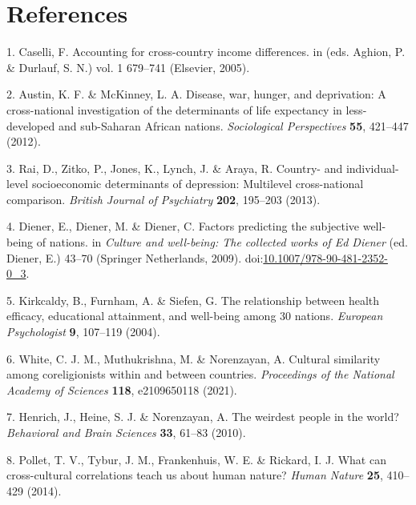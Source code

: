 \documentclass[english,man,floatsintext]{apa6}
\begin{document}
\newpage

\hypertarget{references}{%
\section{References}\label{references}}

\begingroup
\setlength{\parindent}{-0.5in}
\setlength{\leftskip}{0.5in}

\hypertarget{refs}{}
\leavevmode\hypertarget{ref-Caselli2005}{}%
1. Caselli, F. Accounting for cross-country income differences. in (eds. Aghion, P. \& Durlauf, S. N.) vol. 1 679--741 (Elsevier, 2005).

\leavevmode\hypertarget{ref-Austin2012}{}%
2. Austin, K. F. \& McKinney, L. A. Disease, war, hunger, and deprivation: A cross-national investigation of the determinants of life expectancy in less-developed and sub-Saharan African nations. \emph{Sociological Perspectives} \textbf{55}, 421--447 (2012).

\leavevmode\hypertarget{ref-Rai2013}{}%
3. Rai, D., Zitko, P., Jones, K., Lynch, J. \& Araya, R. Country- and individual-level socioeconomic determinants of depression: Multilevel cross-national comparison. \emph{British Journal of Psychiatry} \textbf{202}, 195--203 (2013).

\leavevmode\hypertarget{ref-Diener2009}{}%
4. Diener, E., Diener, M. \& Diener, C. Factors predicting the subjective well-being of nations. in \emph{Culture and well-being: The collected works of Ed Diener} (ed. Diener, E.) 43--70 (Springer Netherlands, 2009). doi:\href{https://doi.org/10.1007/978-90-481-2352-0_3}{10.1007/978-90-481-2352-0\_3}.

\leavevmode\hypertarget{ref-Kirkcaldy2004}{}%
5. Kirkcaldy, B., Furnham, A. \& Siefen, G. The relationship between health efficacy, educational attainment, and well-being among 30 nations. \emph{European Psychologist} \textbf{9}, 107--119 (2004).

\leavevmode\hypertarget{ref-White2021}{}%
6. White, C. J. M., Muthukrishna, M. \& Norenzayan, A. Cultural similarity among coreligionists within and between countries. \emph{Proceedings of the National Academy of Sciences} \textbf{118}, e2109650118 (2021).

\leavevmode\hypertarget{ref-Henrich2010}{}%
7. Henrich, J., Heine, S. J. \& Norenzayan, A. The weirdest people in the world? \emph{Behavioral and Brain Sciences} \textbf{33}, 61--83 (2010).

\leavevmode\hypertarget{ref-Pollet2014}{}%
8. Pollet, T. V., Tybur, J. M., Frankenhuis, W. E. \& Rickard, I. J. What can cross-cultural correlations teach us about human nature? \emph{Human Nature} \textbf{25}, 410--429 (2014).
\end{document}
